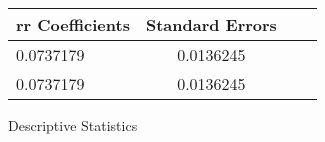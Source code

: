 \begin{tabular}{lccc}{rr}
\hline
   Coefficients &   Standard Errors \\
\hline
      0.0737179 &         0.0136245 \\
      0.0737179 &         0.0136245 \\
\hline
\end{tabular}
\caption{Descriptive Statistics}